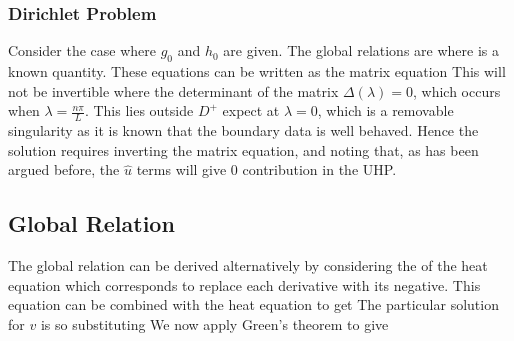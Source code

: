 \documentclass{article}
\begin{document}
\subsubsection{Dirichlet Problem}
Consider the case where $g_0$ and $h_0$ are given. The global relations are 
where 
is a known quantity. These equations can be written as the matrix equation 
This will not be invertible where the determinant of the matrix $\Delta(\lambda) = 0$, which occurs when $\lambda = \frac{n\pi}{L}$. This lies outside $D^+$ expect at $\lambda = 0$, which is a removable singularity as it is known that the boundary data is well behaved. Hence the solution requires inverting the matrix equation, and noting that, as has been argued before, the $\hat{u}$ terms will give 0 contribution in the UHP. 
\subsection{Global Relation}
The global relation can be derived alternatively by considering the  of the heat equation 
which corresponds to replace each derivative with its negative. This equation can be combined with the heat equation to get 
The particular solution for $v$ is 
so substituting 
We now apply Green's theorem to give 
\end{document}
